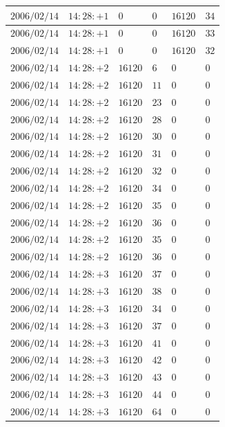 \documentclass[a4j,papersize,disablejfam,slide,14pt]{jsarticle}
\begin{document}
\begin{description}
\begin{center}
\begin{longtable}{|l|l|l|l|l|l|}
					$2006/02/14$ & $14:28:+1$  & $0$ & $0$ & $16120$ & $34$ \\ \hline
					$2006/02/14$ & $14:28:+1$  & $0$ & $0$ & $16120$ & $33$ \\ \hline
					$2006/02/14$ & $14:28:+1$  & $0$ & $0$ & $16120$ & $32$ \\ \hline
					$2006/02/14$ & $14:28:+2$  & $16120$ & $6$ & $0$ & $0$ \\ \hline
					$2006/02/14$ & $14:28:+2$  & $16120$ & $11$ & $0$ & $0$ \\ \hline
					$2006/02/14$ & $14:28:+2$  & $16120$ & $23$ & $0$ & $0$ \\ \hline
					$2006/02/14$ & $14:28:+2$  & $16120$ & $28$ & $0$ & $0$ \\ \hline
					$2006/02/14$ & $14:28:+2$  & $16120$ & $30$ & $0$ & $0$ \\ \hline
					$2006/02/14$ & $14:28:+2$  & $16120$ & $31$ & $0$ & $0$ \\ \hline
					$2006/02/14$ & $14:28:+2$  & $16120$ & $32$ & $0$ & $0$ \\ \hline
					$2006/02/14$ & $14:28:+2$  & $16120$ & $34$ & $0$ & $0$ \\ \hline
					$2006/02/14$ & $14:28:+2$  & $16120$ & $35$ & $0$ & $0$ \\ \hline
					$2006/02/14$ & $14:28:+2$  & $16120$ & $36$ & $0$ & $0$ \\ \hline
					$2006/02/14$ & $14:28:+2$  & $16120$ & $35$ & $0$ & $0$ \\ \hline
					$2006/02/14$ & $14:28:+2$  & $16120$ & $36$ & $0$ & $0$ \\ \hline
					$2006/02/14$ & $14:28:+3$  & $16120$ & $37$ & $0$ & $0$ \\ \hline
					$2006/02/14$ & $14:28:+3$  & $16120$ & $38$ & $0$ & $0$ \\ \hline
					$2006/02/14$ & $14:28:+3$  & $16120$ & $34$ & $0$ & $0$ \\ \hline
					$2006/02/14$ & $14:28:+3$  & $16120$ & $37$ & $0$ & $0$ \\ \hline
					$2006/02/14$ & $14:28:+3$  & $16120$ & $41$ & $0$ & $0$ \\ \hline
					$2006/02/14$ & $14:28:+3$  & $16120$ & $42$ & $0$ & $0$ \\ \hline
					$2006/02/14$ & $14:28:+3$  & $16120$ & $43$ & $0$ & $0$ \\ \hline
					$2006/02/14$ & $14:28:+3$  & $16120$ & $44$ & $0$ & $0$ \\ \hline
					$2006/02/14$ & $14:28:+3$  & $16120$ & $64$ & $0$ & $0$ \\ \hline

\end{longtable}
\end{center}
\end{description}
\end{document}

